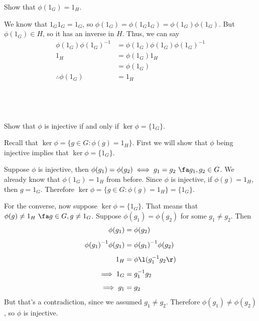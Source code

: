 \documentclass[a4paper]{article}
\begin{document}
\begin{questionbody}
Show that $\phi(1_G) = 1_H$.
\end{questionbody}

We know that $1_G 1_G = 1_G$, so $\phi(1_G) = \phi(1_G 1_G) = \phi(1_G) \phi(1_G)$. But $\phi(1_G) \in H$, so it has an inverse in $H$. Thus, we can say \begin{align*}
    \phi(1_G) {\phi(1_G)}^{-1} &= \phi(1_G) \phi(1_G) {\phi(1_G)}^{-1} \\[1ex]
    1_H &= \phi(1_G) 1_H \\[1ex]
        &= \phi(1_G) \\[1ex]
    \therefore \phi(1_G) &= 1_H
\end{align*}

\subsection{~} %

\begin{questionbody}
Show that $\phi$ is injective if and only if $\ker \phi = \{1_G\}$.
\end{questionbody}

Recall that $\ker \phi = \{g \in G : \phi(g) = 1_H\}$. First we will show that $\phi$ being injective implies that $\ker \phi = \{1_G\}$.

Suppose $\phi$ is injective, then $\phi(g_1) = \phi(g_2) \iff g_1 = g_2\ \fa g_1, g_2 \in G$. We already know that $\phi(1_G) = 1_H$ from before. Since $\phi$ is injective, if $\phi(g) = 1_H$, then $g = 1_G$. Therefore $\ker \phi = \{g \in G : \phi(g) = 1_H\} = \{1_G\}$.

For the converse, now suppose $\ker \phi = \{1_G\}$. That means that $\phi(g) \ne 1_H\ \fa g \in G, g \ne 1_G$. Suppose $\phi(g_1) = \phi(g_2)$ for some $g_1 \ne g_2$. Then \begin{align*}
    \phi(g_1) &= \phi(g_2) \\[1ex]
    {\phi(g_1)}^{-1} \phi(g_1) &= {\phi(g_1)}^{-1} \phi(g_2) \\[1ex]
    1_H &= \phi\l(g_1^{-1} g_2\r) \\[1ex]
    \implies 1_G &= g_1^{-1} g_2 \\[1ex]
    \implies g_1 &= g_2
\end{align*}
But that's a contradiction, since we assumed $g_1 \ne g_2$. Therefore $\phi(g_1) \ne \phi(g_2)$, so $\phi$ is injective.

\newpage
\subsection{~} %
\end{document}
